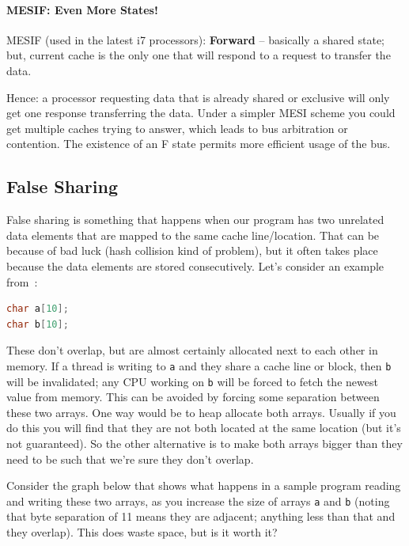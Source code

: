 \paragraph{MESIF: Even More States!} MESIF (used in the latest i7 processors): {\bf Forward} -- basically a shared state; but, current cache is the only one that will respond to a request to transfer the data.

    Hence: a processor requesting data that is already shared or exclusive will
      only get one response transferring the data. Under a simpler MESI scheme you could get multiple caches trying to answer, which leads to bus arbitration or contention. The existence of an F state permits more efficient usage of the bus.
      
      
\subsection*{False Sharing}
False sharing is something that happens when our program has two unrelated data elements that are mapped to the same cache line/location. That can be because of bad luck (hash collision kind of problem), but it often takes place because the data elements are stored consecutively. Let's consider an example from~\cite{falsesharing}:

\begin{lstlisting}[language=C]
char a[10];
char b[10];
\end{lstlisting}
\vspace{-1em}

These don't overlap, but are almost certainly allocated next to each other in memory. If a thread is writing to \texttt{a} and they share a cache line or block, then \texttt{b} will be invalidated; any CPU working on \texttt{b} will be forced to fetch the newest value from memory. This can be avoided by forcing some separation between these two arrays. One way would be to heap allocate both arrays. Usually if you do this you will find that they are not both located at the same location (but it's not guaranteed). So the other alternative is to make both arrays bigger than they need to be such that we're sure they don't overlap.

Consider the graph below that shows what happens in a sample program reading and writing these two arrays, as you increase the size of arrays \texttt{a} and \texttt{b} (noting that byte separation of 11 means they are adjacent; anything less than that and they overlap). This does waste space, but is it worth it?

